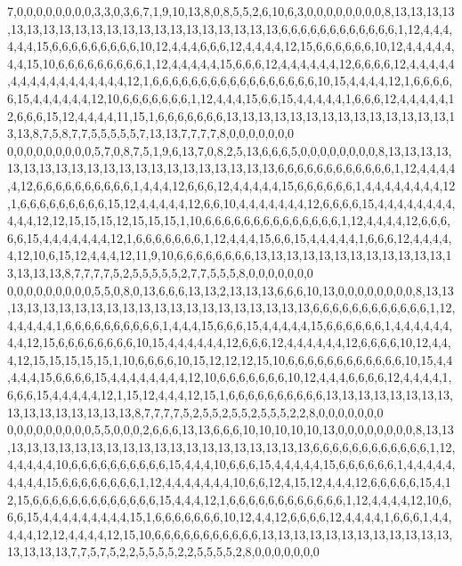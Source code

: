 7,0,0,0,0,0,0,0,0,3,3,0,3,6,7,1,9,10,13,8,0,8,5,5,2,6,10,6,3,0,0,0,0,0,0,0,0,8,13,13,13,13,13,13,13,13,13,13,13,13,13,13,13,13,13,13,13,13,13,6,6,6,6,6,6,6,6,6,6,6,6,1,12,4,4,4,4,4,4,15,6,6,6,6,6,6,6,6,6,10,12,4,4,4,6,6,6,12,4,4,4,4,12,15,6,6,6,6,6,6,10,12,4,4,4,4,4,4,4,15,10,6,6,6,6,6,6,6,6,6,1,12,4,4,4,4,4,15,6,6,6,12,4,4,4,4,4,4,12,6,6,6,6,12,4,4,4,4,4,4,4,4,4,4,4,4,4,4,4,4,4,12,1,6,6,6,6,6,6,6,6,6,6,6,6,6,6,6,6,6,10,15,4,4,4,4,12,1,6,6,6,6,6,15,4,4,4,4,4,4,12,10,6,6,6,6,6,6,6,1,12,4,4,4,15,6,6,15,4,4,4,4,4,1,6,6,6,12,4,4,4,4,4,12,6,6,6,15,12,4,4,4,4,11,15,1,6,6,6,6,6,6,6,13,13,13,13,13,13,13,13,13,13,13,13,13,13,13,13,8,7,5,8,7,7,5,5,5,5,5,7,13,13,7,7,7,7,8,0,0,0,0,0,0,0
0,0,0,0,0,0,0,0,0,5,7,0,8,7,5,1,9,6,13,7,0,8,2,5,13,6,6,6,5,0,0,0,0,0,0,0,0,8,13,13,13,13,13,13,13,13,13,13,13,13,13,13,13,13,13,13,13,13,13,6,6,6,6,6,6,6,6,6,6,6,6,1,12,4,4,4,4,4,12,6,6,6,6,6,6,6,6,6,6,1,4,4,4,12,6,6,6,12,4,4,4,4,4,15,6,6,6,6,6,6,1,4,4,4,4,4,4,4,4,12,1,6,6,6,6,6,6,6,6,6,15,12,4,4,4,4,4,12,6,6,10,4,4,4,4,4,4,4,12,6,6,6,6,15,4,4,4,4,4,4,4,4,4,4,4,12,12,15,15,15,12,15,15,15,1,10,6,6,6,6,6,6,6,6,6,6,6,6,6,6,1,12,4,4,4,4,12,6,6,6,6,6,15,4,4,4,4,4,4,4,12,1,6,6,6,6,6,6,6,1,12,4,4,4,15,6,6,15,4,4,4,4,4,1,6,6,6,12,4,4,4,4,4,12,10,6,15,12,4,4,4,12,11,9,10,6,6,6,6,6,6,6,6,13,13,13,13,13,13,13,13,13,13,13,13,13,13,13,13,8,7,7,7,7,5,2,5,5,5,5,5,2,7,7,5,5,5,8,0,0,0,0,0,0,0
0,0,0,0,0,0,0,0,0,5,5,0,8,0,13,6,6,6,13,13,2,13,13,13,6,6,6,10,13,0,0,0,0,0,0,0,0,8,13,13,13,13,13,13,13,13,13,13,13,13,13,13,13,13,13,13,13,13,13,6,6,6,6,6,6,6,6,6,6,6,6,1,12,4,4,4,4,4,1,6,6,6,6,6,6,6,6,6,6,1,4,4,4,15,6,6,6,15,4,4,4,4,4,15,6,6,6,6,6,6,1,4,4,4,4,4,4,4,4,12,15,6,6,6,6,6,6,6,6,10,15,4,4,4,4,4,4,12,6,6,6,12,4,4,4,4,4,4,12,6,6,6,6,10,12,4,4,4,12,15,15,15,15,15,1,10,6,6,6,6,10,15,12,12,12,15,10,6,6,6,6,6,6,6,6,6,6,6,6,10,15,4,4,4,4,4,15,6,6,6,6,15,4,4,4,4,4,4,4,4,12,10,6,6,6,6,6,6,6,10,12,4,4,4,6,6,6,6,12,4,4,4,4,1,6,6,6,15,4,4,4,4,4,12,1,15,12,4,4,4,12,15,1,6,6,6,6,6,6,6,6,6,6,13,13,13,13,13,13,13,13,13,13,13,13,13,13,13,13,8,7,7,7,7,5,2,5,5,2,5,5,2,5,5,5,2,2,8,0,0,0,0,0,0,0
0,0,0,0,0,0,0,0,0,5,5,0,0,0,2,6,6,6,13,13,6,6,6,10,10,10,10,10,13,0,0,0,0,0,0,0,0,8,13,13,13,13,13,13,13,13,13,13,13,13,13,13,13,13,13,13,13,13,13,6,6,6,6,6,6,6,6,6,6,6,6,1,12,4,4,4,4,4,10,6,6,6,6,6,6,6,6,6,6,15,4,4,4,10,6,6,6,15,4,4,4,4,4,15,6,6,6,6,6,6,1,4,4,4,4,4,4,4,4,4,15,6,6,6,6,6,6,6,6,1,12,4,4,4,4,4,4,4,10,6,6,12,4,15,12,4,4,4,12,6,6,6,6,6,15,4,12,15,6,6,6,6,6,6,6,6,6,6,6,6,6,15,4,4,4,12,1,6,6,6,6,6,6,6,6,6,6,6,6,1,12,4,4,4,4,12,10,6,6,6,15,4,4,4,4,4,4,4,4,4,15,1,6,6,6,6,6,6,6,10,12,4,4,12,6,6,6,6,12,4,4,4,4,1,6,6,6,1,4,4,4,4,4,12,12,4,4,4,4,12,15,10,6,6,6,6,6,6,6,6,6,6,6,13,13,13,13,13,13,13,13,13,13,13,13,13,13,13,13,7,7,5,7,5,2,2,5,5,5,5,2,2,5,5,5,5,2,8,0,0,0,0,0,0,0
